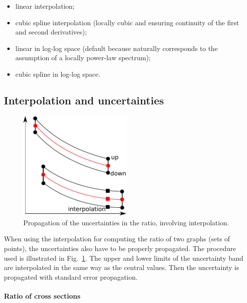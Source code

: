 \documentclass[a4paper,10pt]{article}
\begin{document}
 \begin{itemize}
  \item linear interpolation;
  \item cubic spline interpolation (locally cubic and ensuring continuity of the first and second derivatives);
  \item linear in log-log space (default because naturally corresponds to the assumption of a locally power-law spectrum);
  \item cubic spline in log-log space.
 \end{itemize}
 
 \subsection{Interpolation and uncertainties}
 
 \begin{figure}
  \begin{center}
   \includegraphics[width=0.5\textwidth]{uncert_interpol.pdf}
  \end{center}
  \caption{Propagation of the uncertainties in the ratio, involving interpolation.
  \label{fig:uncert_interpol}}
 \end{figure}

 When using the interpolation for computing the ratio of two graphs (sets of points), the uncertainties also have to be properly propagated. The procedure used is illustrated in Fig.~\ref{fig:uncert_interpol}.
 The upper and lower limits of the uncertainty band are interpolated in the same way as the central values. Then the uncertainty is propagated with standard error propagation.
 
 \paragraph{Ratio of cross sections}
 
\end{document}
